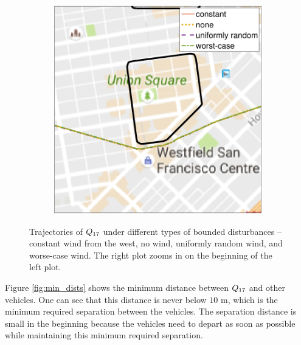 \begin{figure}[!htb]
\begin{subfigure}{0.5\textwidth}
    \includegraphics[width=\columnwidth]{figs/dstb_trajs_zoomed_in}
    \subcaption{}
    \label{fig:dstb_trajs_s2}
  \end{subfigure}%

  \caption{Trajectories of $Q_{17}$ under different types of bounded disturbances -- constant wind from the west, no wind, uniformly random wind, and worse-case wind. The right plot zooms in on the beginning of the left plot.}
  \label{fig:dstb_trajs}
\end{figure}

Figure \ref{fig:min_dists} shows the minimum distance between $Q_{17}$ and other vehicles. One can see that this distance is never below $10$ m, which is the minimum required separation between the vehicles. The separation distance is small in the beginning because the vehicles need to depart as soon as possible while maintaining this minimum required separation. 

